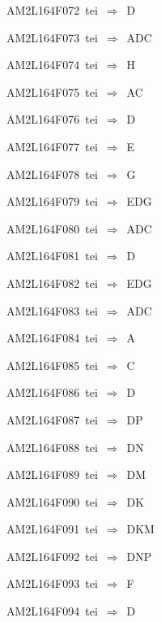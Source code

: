 {\sixrm AM2L164F072\ {\sixit tei}\ }$\Rightarrow$\ D\par\smallskip
{\sixrm AM2L164F073\ {\sixit tei}\ }$\Rightarrow$\ ADC\par\smallskip
{\sixrm AM2L164F074\ {\sixit tei}\ }$\Rightarrow$\ H\par\smallskip
{\sixrm AM2L164F075\ {\sixit tei}\ }$\Rightarrow$\ AC\par\smallskip
{\sixrm AM2L164F076\ {\sixit tei}\ }$\Rightarrow$\ D\par\smallskip
{\sixrm AM2L164F077\ {\sixit tei}\ }$\Rightarrow$\ E\par\smallskip
{\sixrm AM2L164F078\ {\sixit tei}\ }$\Rightarrow$\ G\par\smallskip
{\sixrm AM2L164F079\ {\sixit tei}\ }$\Rightarrow$\ EDG\par\smallskip
{\sixrm AM2L164F080\ {\sixit tei}\ }$\Rightarrow$\ ADC\par\smallskip
{\sixrm AM2L164F081\ {\sixit tei}\ }$\Rightarrow$\ D\par\smallskip
{\sixrm AM2L164F082\ {\sixit tei}\ }$\Rightarrow$\ EDG\par\smallskip
{\sixrm AM2L164F083\ {\sixit tei}\ }$\Rightarrow$\ ADC\par\smallskip
{\sixrm AM2L164F084\ {\sixit tei}\ }$\Rightarrow$\ A\par\smallskip
{\sixrm AM2L164F085\ {\sixit tei}\ }$\Rightarrow$\ C\par\smallskip
{\sixrm AM2L164F086\ {\sixit tei}\ }$\Rightarrow$\ D\par\smallskip
{\sixrm AM2L164F087\ {\sixit tei}\ }$\Rightarrow$\ DP\par\smallskip
{\sixrm AM2L164F088\ {\sixit tei}\ }$\Rightarrow$\ DN\par\smallskip
{\sixrm AM2L164F089\ {\sixit tei}\ }$\Rightarrow$\ DM\par\smallskip
{\sixrm AM2L164F090\ {\sixit tei}\ }$\Rightarrow$\ DK\par\smallskip
{\sixrm AM2L164F091\ {\sixit tei}\ }$\Rightarrow$\ DKM\par\smallskip
{\sixrm AM2L164F092\ {\sixit tei}\ }$\Rightarrow$\ DNP\par\smallskip
{\sixrm AM2L164F093\ {\sixit tei}\ }$\Rightarrow$\ F\par\smallskip
{\sixrm AM2L164F094\ {\sixit tei}\ }$\Rightarrow$\ D\par\smallskip

